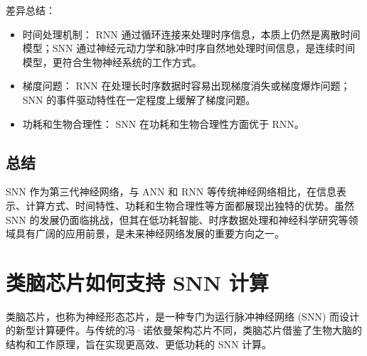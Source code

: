 \documentclass[12pt, a4paper, oneside]{ctexart}
\numberwithin{equation}{section}  %
\begin{document}
差异总结：
\begin{itemize}
    \item 时间处理机制： RNN 通过循环连接来处理时序信息，本质上仍然是离散时间模型；SNN 通过神经元动力学和脉冲时序自然地处理时间信息，是连续时间模型，更符合生物神经系统的工作方式。
    \item 梯度问题： RNN 在处理长时序数据时容易出现梯度消失或梯度爆炸问题；SNN 的事件驱动特性在一定程度上缓解了梯度问题。
    \item 功耗和生物合理性： SNN 在功耗和生物合理性方面优于 RNN。
\end{itemize}
\subsection{总结}
SNN 作为第三代神经网络，与 ANN 和 RNN 等传统神经网络相比，在信息表示、计算方式、时间特性、功耗和生物合理性等方面都展现出独特的优势。虽然 SNN 的发展仍面临挑战，但其在低功耗智能、时序数据处理和神经科学研究等领域具有广阔的应用前景，是未来神经网络发展的重要方向之一。

\section{类脑芯片如何支持 SNN 计算}
类脑芯片，也称为神经形态芯片，是一种专门为运行脉冲神经网络 (SNN) 而设计的新型计算硬件。与传统的冯·诺依曼架构芯片不同，类脑芯片借鉴了生物大脑的结构和工作原理，旨在实现更高效、更低功耗的 SNN 计算\cite{ref6,ref7,ref8}。
\end{document}

